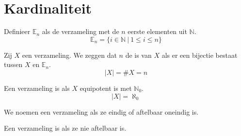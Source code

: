 \chapter{Kardinaliteit}
\label{ch:kardinaliteit}

\begin{de}
  Definieer $\mathbb{E}_{n}$ als de verzameling met de $n$ eerste elementen uit $\mathbb{N}$.
  \[ \mathbb{E}_{n} = \{ i \in \mathbb{N}\ |\ 1 \le i \le n \}\] 
\end{de}

\begin{de}
  Zij $X$ een verzameling. We zeggen dat $n$ de  is van $X$ als er een bijectie bestaat tussen $X$ en $\mathbb{E}_{n}$.
  \[ |X| = \#X = n \]
\end{de}

\begin{de}
  Een verzameling is  als $X$ equipotent is met $\mathbb{N}_{0}$.
  \[ |X| = \aleph_{0} \]
\end{de}

\begin{de}
  We noemen een verzameling  als ze eindig of aftelbaar oneindig is. 
\end{de}

\begin{de}
  Een verzameling is  als ze nie aftelbaar is.
\end{de}
